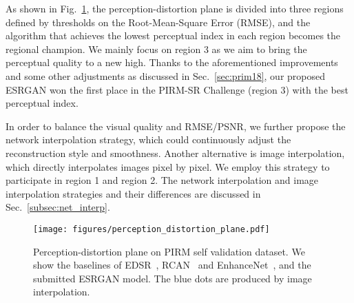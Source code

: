 \documentclass[runningheads]{llncs}
\begin{document}
As shown in Fig.~\ref{fig:perception_distortion_plane}, the perception-distortion plane is divided into three regions 
defined by thresholds on the Root-Mean-Square Error (RMSE), and the algorithm that achieves the lowest perceptual index 
in each region becomes the regional champion.
%
We mainly focus on region 3 as we aim to bring the perceptual quality to a new high. 
Thanks to the aforementioned improvements and some other adjustments as discussed in 
Sec.~\ref{sec:prim18}, our proposed ESRGAN won the first place in the PIRM-SR Challenge (region 3) with the best 
perceptual index.

In order to balance the visual quality and RMSE/PSNR, we further propose the network interpolation strategy, which 
could continuously adjust the reconstruction style and smoothness.
%
Another alternative is image interpolation, which directly interpolates images pixel by pixel. 
% 
We employ this strategy to participate in region 1 and region 2. 
%
The network interpolation and image interpolation strategies and their differences are discussed in 
Sec.~\ref{subsec:net_interp}.

\begin{figure}[tbp]
	\begin{center}
		\texttt{[image: figures/perception\_distortion\_plane.pdf]}
	\end{center}
	\vspace{-0.4cm}
	\caption{Perception-distortion plane on PIRM self validation dataset. We show the baselines of 
		EDSR~\cite{lim2017enhanced}, RCAN~\cite{zhang2018image} and EnhanceNet~\cite{sajjadi2017enhancenet}, and the 
		submitted ESRGAN model. The blue dots are produced by image interpolation.}
	\label{fig:perception_distortion_plane}
	\vspace{-0.4cm}
\end{figure}
\end{document}
